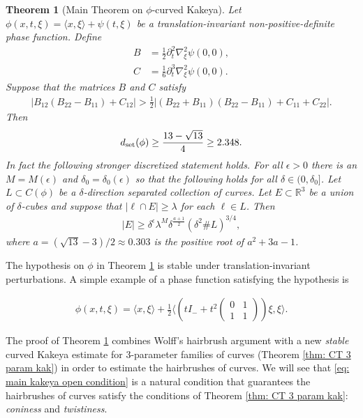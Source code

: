 \documentclass[12pt]{amsart}
\numberwithin{equation}{section}
\newtheorem{theorem}{Theorem}
\newcommand{\R}{\mathbb{R}}
\newcommand{\1}{\mathbbm{1}}
\begin{document}
\begin{theorem}[Main Theorem on $\phi$-curved Kakeya]\label{thm: main phicurved kakeya}
    Let $\phi(x,t,\xi) = \langle x, \xi \rangle + \psi(t,\xi)$ be a translation-invariant non-positive-definite phase function. Define 
    \begin{align}
        B &=  \tfrac{1}{2}\partial_t^2 \nabla_\xi^2 \psi(0,0), \\
        C &= \tfrac{1}{6} \partial_t^3 \nabla_\xi^2 \psi(0,0). 
    \end{align}
    Suppose that the matrices $B$ and $C$ satisfy
    \begin{align}\label{eq: main kakeya open condition}
        |B_{12}(B_{22} - B_{11}) + C_{12}| > \frac{1}{2} |(B_{22} + B_{11})(B_{22} - B_{11}) + C_{11} + C_{22}|.
    \end{align}
    Then 
    \begin{align}
        d_{\rm{set}}(\phi) \geq \frac{13 - \sqrt{13}}{4} \geq 2.348.
    \end{align}
    In fact the following stronger discretized statement holds. For all $\epsilon > 0$ there is an $M = M(\epsilon)$ and $\delta_0 = \delta_0(\epsilon)$ so that the following holds for all $\delta \in (0, \delta_0]$. Let $L \subset C(\phi)$ be a $\delta$-direction separated collection of curves. Let $E \subset \R^3$ be a union of $\delta$-cubes and suppose that $|\ell \cap E| \geq \lambda$ for each $\ell \in L$. Then 
    \begin{align}
        |E| \geq \delta^\epsilon \lambda^{M} \delta^{\frac{a + 1}{2}} (\delta^2 \# L)^{3/4}, 
    \end{align}
    where $a = (\sqrt{13} - 3)/2 \approx 0.303$ is the positive root of $a^2  + 3a - 1$.  
\end{theorem}

The hypothesis on $\phi$ in Theorem \ref{thm: main phicurved kakeya} is stable under translation-invariant perturbations. A simple example of a phase function satisfying the hypothesis is

\begin{align}
    \phi(x,t,\xi) = \langle x,\xi\rangle + \frac{1}{2}\langle \left( t I_- + t^2
    \begin{pmatrix}
        0 & 1 \\
        1 & 1
    \end{pmatrix} \right)
    \xi, \xi\rangle.
\end{align}

The proof of Theorem \ref{thm: main phicurved kakeya} combines Wolff's hairbrush argument \cite{wolffHairbrush} with a new \emph{stable} curved Kakeya estimate for 3-parameter families of curves (Theorem \ref{thm: CT 3 param kak}) in order to estimate the hairbrushes of curves. We will see that \eqref{eq: main kakeya open condition} is a natural condition that guarantees the hairbrushes of curves satisfy the conditions of Theorem \ref{thm: CT 3 param kak}: \emph{coniness} and \emph{twistiness}. 
\end{document}
